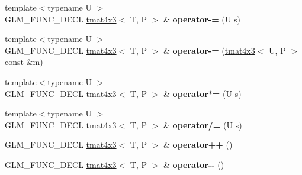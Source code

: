 \begin{DoxyCompactItemize}
\item 
\hypertarget{structglm_1_1detail_1_1tmat4x3_afe60f638ecc619992856f0775383be8c}{{\footnotesize template$<$typename U $>$ }\\G\-L\-M\-\_\-\-F\-U\-N\-C\-\_\-\-D\-E\-C\-L \hyperlink{structglm_1_1detail_1_1tmat4x3}{tmat4x3}$<$ T, P $>$ \& {\bfseries operator-\/=} (U s)}\label{structglm_1_1detail_1_1tmat4x3_afe60f638ecc619992856f0775383be8c}

\item 
\hypertarget{structglm_1_1detail_1_1tmat4x3_ac22917356357c54fc3d560b53b7d882c}{{\footnotesize template$<$typename U $>$ }\\G\-L\-M\-\_\-\-F\-U\-N\-C\-\_\-\-D\-E\-C\-L \hyperlink{structglm_1_1detail_1_1tmat4x3}{tmat4x3}$<$ T, P $>$ \& {\bfseries operator-\/=} (\hyperlink{structglm_1_1detail_1_1tmat4x3}{tmat4x3}$<$ U, P $>$ const \&m)}\label{structglm_1_1detail_1_1tmat4x3_ac22917356357c54fc3d560b53b7d882c}

\item 
\hypertarget{structglm_1_1detail_1_1tmat4x3_aa0414419a047b76b18eb96110d207cf3}{{\footnotesize template$<$typename U $>$ }\\G\-L\-M\-\_\-\-F\-U\-N\-C\-\_\-\-D\-E\-C\-L \hyperlink{structglm_1_1detail_1_1tmat4x3}{tmat4x3}$<$ T, P $>$ \& {\bfseries operator$\ast$=} (U s)}\label{structglm_1_1detail_1_1tmat4x3_aa0414419a047b76b18eb96110d207cf3}

\item 
\hypertarget{structglm_1_1detail_1_1tmat4x3_a62e93a547d93d5f3d962d9af8e6ad9d7}{{\footnotesize template$<$typename U $>$ }\\G\-L\-M\-\_\-\-F\-U\-N\-C\-\_\-\-D\-E\-C\-L \hyperlink{structglm_1_1detail_1_1tmat4x3}{tmat4x3}$<$ T, P $>$ \& {\bfseries operator/=} (U s)}\label{structglm_1_1detail_1_1tmat4x3_a62e93a547d93d5f3d962d9af8e6ad9d7}

\item 
\hypertarget{structglm_1_1detail_1_1tmat4x3_aa43e9bf0fae76220a4acd8a37a7a2a6a}{G\-L\-M\-\_\-\-F\-U\-N\-C\-\_\-\-D\-E\-C\-L \hyperlink{structglm_1_1detail_1_1tmat4x3}{tmat4x3}$<$ T, P $>$ \& {\bfseries operator++} ()}\label{structglm_1_1detail_1_1tmat4x3_aa43e9bf0fae76220a4acd8a37a7a2a6a}

\item 
\hypertarget{structglm_1_1detail_1_1tmat4x3_a9142d63a4f237f74fd5cc23a40f03453}{G\-L\-M\-\_\-\-F\-U\-N\-C\-\_\-\-D\-E\-C\-L \hyperlink{structglm_1_1detail_1_1tmat4x3}{tmat4x3}$<$ T, P $>$ \& {\bfseries operator-\/-\/} ()}\label{structglm_1_1detail_1_1tmat4x3_a9142d63a4f237f74fd5cc23a40f03453}


\end{DoxyCompactItemize}
